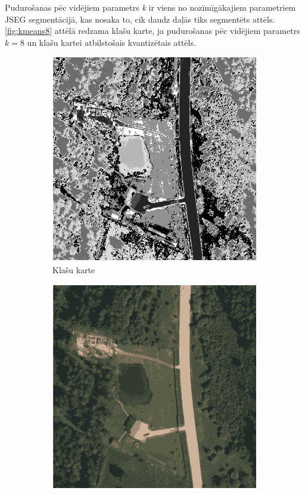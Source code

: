 \documentclass[12pt,paper=a4]{report}
\begin{document}
Pudurošanas pēc vidējiem parametrs \textit{k} ir viens no nozīmīgākajiem parametriem JSEG segmentācijā, kas nosaka to, cik daudz daļās tiks segmentēts attēls. \ref{fig:kmeans8} attēlā redzama klašu karte, ja pudurošanas pēc vidējiem parametrs $k=8$ un klašu kartei atbilstošais kvantizētais attēls. 
\begin{figure}[h!]
\centering
\begin{subfigure}[b]{.4\linewidth}
\includegraphics[width=\linewidth]{map8part}
\caption{Klašu karte}
\label{kmeans8map}
\end{subfigure}
\begin{subfigure}[b]{.4\linewidth}
\includegraphics[width=\linewidth]{ImgQ8part}

\end{subfigure}
\end{figure}
\end{document}
